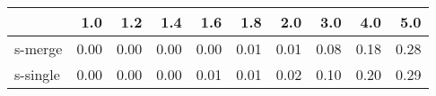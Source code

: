 \begin{tabular}{lrrrrrrrrr}
\toprule
{} &  1.0 &  1.2 &  1.4 &  1.6 &  1.8 &  2.0 &  3.0 &  4.0 &  5.0 \\
\midrule
s-merge  & 0.00 & 0.00 & 0.00 & 0.00 & 0.01 & 0.01 & 0.08 & 0.18 & 0.28 \\
s-single & 0.00 & 0.00 & 0.00 & 0.01 & 0.01 & 0.02 & 0.10 & 0.20 & 0.29 \\
\bottomrule
\end{tabular}
